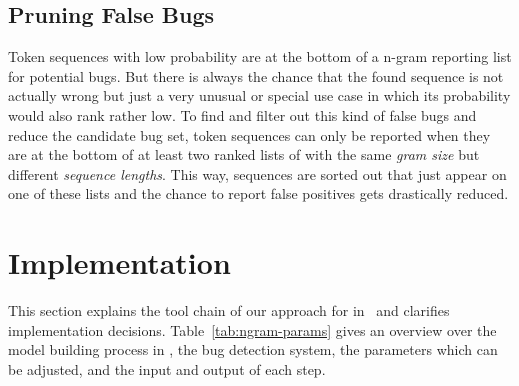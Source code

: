 \subsection{Pruning False Bugs}\label{subsec:false_bugs}
Token sequences with low probability are at the bottom of a n-gram reporting list for potential bugs. But there is always the chance that the found sequence is not actually wrong but just a very unusual or special use case in which its probability would also rank rather low. To find and filter out this kind of false bugs and reduce the candidate bug set, token sequences can only be reported when they are at the bottom of at least two ranked lists of  with the same \textit{gram size} but different \textit{sequence lengths}. This way, sequences are sorted out that just appear on one of these lists and the chance to report false positives gets drastically reduced. 


\section{Implementation}\label{sec:implementation}
This section explains the tool chain of our approach for \ngram{} in \scratch\ and clarifies implementation
decisions. Table~\ref{tab:ngram-params} gives an overview over the model building process in \scratch, the bug detection system, the parameters which can be adjusted, and the input and output of each step.

